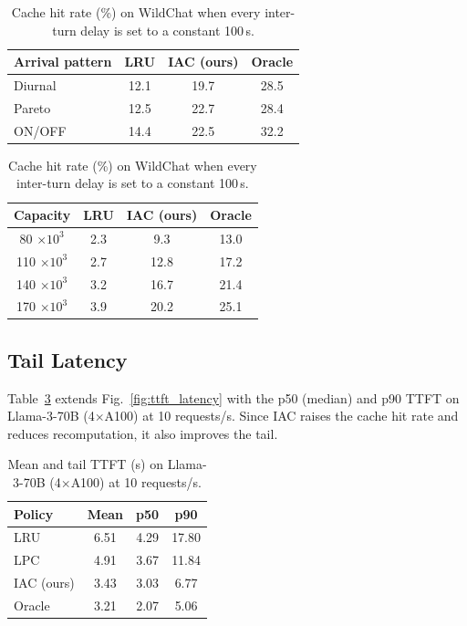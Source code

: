 \documentclass{article}
\begin{document}
\begin{table}[h]
\centering
\begin{minipage}[t]{0.45\linewidth}
\centering
\caption{Cache hit rate (\%) on WildChat at 140K token capacity under different arrival patterns of new conversations.}
\label{tab:arrival}
\small
\begin{tabular}{lccc}
\toprule
Arrival pattern & LRU & IAC (ours) & Oracle \\
\midrule
Diurnal & 12.1 & 19.7 & 28.5 \\
Pareto  & 12.5 & 22.7 & 28.4 \\
ON/OFF  & 14.4 & 22.5 & 32.2 \\
\bottomrule
\end{tabular}
\end{minipage}
\hfill
\begin{minipage}[t]{0.5\linewidth}
\centering
\caption{Cache hit rate (\%) on WildChat when every inter-turn delay is set to a constant 100\,s.}
\label{tab:uniform}
\small
\begin{tabular}{cccc}
\toprule
Capacity & LRU & IAC (ours) & Oracle \\
\midrule
80 \(\times 10^3\)  & 2.3 & 9.3  & 13.0 \\
110 \(\times 10^3\) & 2.7 & 12.8 & 17.2 \\
140 \(\times 10^3\) & 3.2 & 16.7 & 21.4 \\
170 \(\times 10^3\) & 3.9 & 20.2 & 25.1 \\
\bottomrule
\end{tabular}
\end{minipage}
\end{table}




\subsection{Tail Latency}
\label{app:tail_latency}
Table~\ref{tab:tail} extends Fig.~\ref{fig:ttft_latency} with the p50 (median) and p90 TTFT on Llama-3-70B (4\(\times\)A100) at 10 requests/s. Since IAC raises the cache hit rate and reduces recomputation, it also improves the tail.

\begin{table}[h]
\centering
\caption{Mean and tail TTFT (s) on Llama-3-70B (4\(\times\)A100) at 10 requests/s.}
\label{tab:tail}
\small
\begin{tabular}{lccc}
\toprule
Policy & Mean & p50 & p90 \\
\midrule
LRU        & 6.51 & 4.29 & 17.80 \\
LPC        & 4.91 & 3.67 & 11.84 \\
IAC (ours) & 3.43 & 3.03 & 6.77 \\
Oracle     & 3.21 & 2.07 & 5.06 \\
\bottomrule
\end{tabular}
\end{table}
\end{document}
